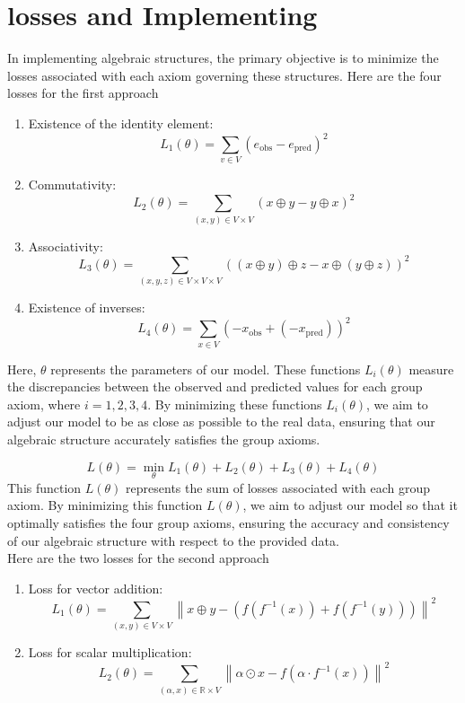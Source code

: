 \documentclass{article}
\begin{document}
\section{losses and Implementing}
\begin{frame}
    In implementing algebraic structures, 
    the primary objective is to minimize 
    the losses associated with each axiom 
    governing these structures. 
    Here are the four losses for the first approach

    \begin{enumerate}
        \item Existence of the identity element:  \[
            L_1(\theta) = \sum_{v \in V} (e_{\text{obs}} - e_{\text{pred}})^2
            \]
        \item Commutativity:
        \[
        L_2(\theta) = \sum_{(x, y) \in V \times V} (x \oplus y - y \oplus x)^2
        \]
        \item Associativity:
        \[
        L_3(\theta) = \sum_{(x, y, z) \in V \times V \times V} ((x \oplus y) \oplus z - x \oplus (y \oplus z))^2
        \]
        \item Existence of inverses:
        \[
        L_4(\theta) = \sum_{x \in V} (-x_{\text{obs}} + (-x_{\text{pred}}))^2
        \] 
    \end{enumerate}
    Here, $\theta$ represents the parameters of our model.
     These functions $L_i(\theta)$ measure the discrepancies
      between the observed and predicted values for each group 
      axiom, where $i = 1, 2, 3, 4$. By minimizing these functions
       $L_i(\theta)$, we aim to adjust our model to be as close as
        possible to the real data, ensuring that our algebraic 
        structure accurately satisfies the group axioms. 

     $$
     L(\theta) = \min_{\theta} L_1(\theta) + L_2(\theta) + L_3(\theta) + L_4(\theta)
     $$
 This function $L(\theta)$ represents the sum of losses 
 associated with each group axiom. By minimizing 
 this function $L(\theta)$, we aim to adjust our model so
  that it optimally satisfies the four group axioms, 
  ensuring the accuracy and consistency of our 
  algebraic structure with respect to the provided data.\\
  Here are the two losses for the second approach
  \begin{enumerate}
    \item Loss for vector addition:
    \[
    L_1(\theta) = \sum_{(x, y) \in V \times V} \left\lVert x \oplus y - \left(f(f^{-1}(x)) + f(f^{-1}(y))\right) \right\rVert^2
    \]
    \item Loss for scalar multiplication:
    \[
    L_2(\theta) = \sum_{(\alpha, x) \in \mathbb{R} \times V} \left\lVert \alpha \odot x - f(\alpha \cdot f^{-1}(x)) \right\rVert^2
    \]
\end{enumerate}


\end{frame}
\end{document}
